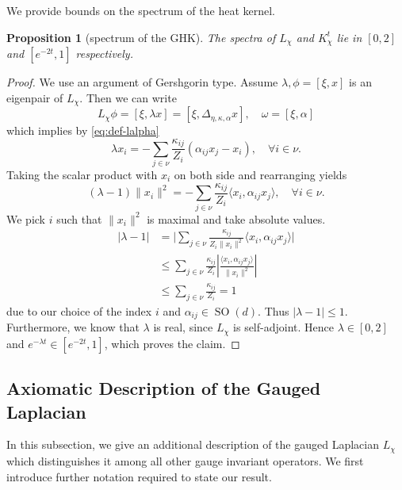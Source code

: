 \documentclass[10pt,reqno]{amsart}
\numberwithin{equation}{section}
\theoremstyle{bfnote}
\newtheorem{proposition}[theorem]{Proposition}
\theoremstyle{bfdef}
\newcommand{\la}{\langle}
\newcommand{\ra}{\rangle}
\DeclareMathOperator{\SO}{SO}
\providecommand\x; %
\renewcommand{\x}{x}
\providecommand\gt; %
\renewcommand{\gt}{\xi}
\providecommand\a; %
\renewcommand{\a}{\alpha}
\providecommand\Lpl; %
\renewcommand{\Lpl}{\Delta}
\providecommand\hgen; %
\renewcommand{\hgen}{L}
\providecommand\vg; %
\renewcommand{\vg}{\chi}
\begin{document}
		We provide bounds on the spectrum of the heat kernel.
		\begin{proposition}[spectrum of the GHK]
			The spectra of $\hgen_{\vg}$ and $K_{\vg}^t$ lie in $[0,2]$ and $[e^{-2t},1]$ respectively.
		\end{proposition}

		\begin{proof}
			We use an argument of Gershgorin type. Assume $\lambda, \phi=[\xi,\x]$ is an eigenpair of $\hgen_{\vg}$. Then we can write
			\begin{equation}
				\hgen_{\vg}\phi = [\gt,\lambda \x ] = [\gt,\Lpl_{\eta,\kappa,\alpha}x], \quad \omega = [\gt,\a]
			\end{equation}
			which implies by \eqref{eq:def-lalpha}
			\begin{equation}
				\lambda \x_i = -\sum_{j \in \nu} \frac{\kappa_{ij}}{Z_i} (\a_{ij} \x_j - \x_{i}), \quad \forall i \in \nu.
			\end{equation}
			Taking the scalar product with $\x_i$ on both side and rearranging yields
			\begin{equation}
				(\lambda - 1) \|x_i\|^2 = -\sum_{j \in \nu} \frac{\kappa_{ij}}{Z_i} \la \x_i, \a_{ij} \x_j \ra, \quad \forall i \in \nu.
			\end{equation}
			We pick $i$ such that $\|x_i\|^2$ is maximal and take absolute values.
			\begin{equation}
			\begin{aligned}
				|\lambda - 1|
				&=
				\bigg| \sum_{j \in \nu} \frac{\kappa_{ij}}{Z_i \|x_i\|^2} \la \x_i, \a_{ij} \x_j \ra \bigg| \\
				&\leq
				\sum_{j \in \nu} \frac{\kappa_{ij}}{Z_i} \left| \frac{\la \x_i, \a_{ij} \x_j \ra}{\|x_i\|^2} \right|
				\\
				&\leq
				\sum_{j \in \nu} \frac{\kappa_{ij}}{Z_i} = 1
			\end{aligned}
			\end{equation}
			due to our choice of the index $i$ and $\alpha_{ij} \in \SO(d)$.			Thus $| \lambda - 1 | \leq 1$. Furthermore, we know that $\lambda$ is real, since $\hgen_{\vg}$ is self-adjoint. Hence $\lambda \in [0,2]$ and $e^{-\lambda t} \in [e^{-2t},1]$, which proves the claim.
		\end{proof}

\subsection{Axiomatic Description of the Gauged Laplacian}
	In this subsection, we give an additional description of the gauged Laplacian $\hgen_{\vg}$ which distinguishes it among all other gauge invariant operators. We first introduce further notation required to state our result.
\end{document}
